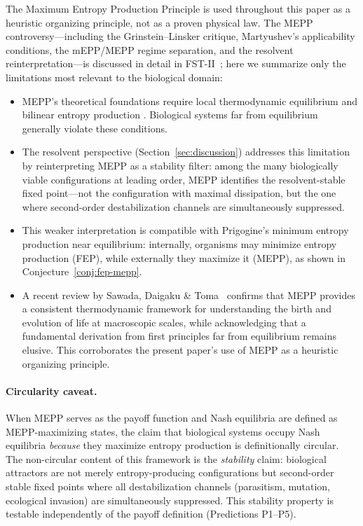 \documentclass[12pt,a4paper]{article}
\theoremstyle{remark}
\begin{document}
The Maximum Entropy Production Principle is used throughout this paper as a heuristic organizing principle, not as a proven physical law. The MEPP controversy---including the Grinstein--Linsker critique, Martyushev's applicability conditions, the mEPP/MEPP regime separation, and the resolvent reinterpretation---is discussed in detail in FST-II~\citep{FSTII}; here we summarize only the limitations most relevant to the biological domain:
\begin{itemize}
\item MEPP's theoretical foundations require local thermodynamic equilibrium and bilinear entropy production \citep{Martyushev2010}. Biological systems far from equilibrium generally violate these conditions.
\item The resolvent perspective (Section~\ref{sec:discussion}) addresses this limitation by reinterpreting MEPP as a stability filter: among the many biologically viable configurations at leading order, MEPP identifies the resolvent-stable fixed point---not the configuration with maximal dissipation, but the one where second-order destabilization channels are simultaneously suppressed.
\item This weaker interpretation is compatible with Prigogine's minimum entropy production near equilibrium: internally, organisms may minimize entropy production (FEP), while externally they maximize it (MEPP), as shown in Conjecture~\ref{conj:fep-mepp}.
\item A recent review by Sawada, Daigaku \& Toma~\citep{Toma2025} confirms that MEPP provides a consistent thermodynamic framework for understanding the birth and evolution of life at macroscopic scales, while acknowledging that a fundamental derivation from first principles far from equilibrium remains elusive. This corroborates the present paper's use of MEPP as a heuristic organizing principle.
\end{itemize}

\paragraph{Circularity caveat.} When MEPP serves as the payoff function and Nash equilibria are defined as MEPP-maximizing states, the claim that biological systems occupy Nash equilibria \emph{because} they maximize entropy production is definitionally circular. The non-circular content of this framework is the \emph{stability} claim: biological attractors are not merely entropy-producing configurations but second-order stable fixed points where all destabilization channels (parasitism, mutation, ecological invasion) are simultaneously suppressed. This stability property is testable independently of the payoff definition (Predictions P1--P5).
\end{document}
